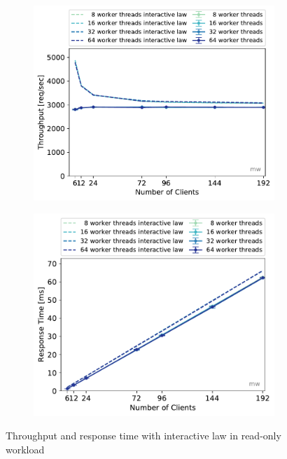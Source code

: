 \documentclass[11pt,a4paper]{article}
\begin{document}
\begin{figure}
	\begin{subfigure}[b]{.49\linewidth}
		\centering
		\includegraphics[width=\linewidth]{data/exp32_ro_tp_nc_w.pdf}
	\end{subfigure}\hfill
	\begin{subfigure}[b]{.49\linewidth}
		\centering
		\includegraphics[width=\linewidth]{data/exp32_ro_rt_nc_w.pdf}
	\end{subfigure}%
	\caption{Throughput and response time with interactive law in read-only workload}
\end{figure}
\end{document}

